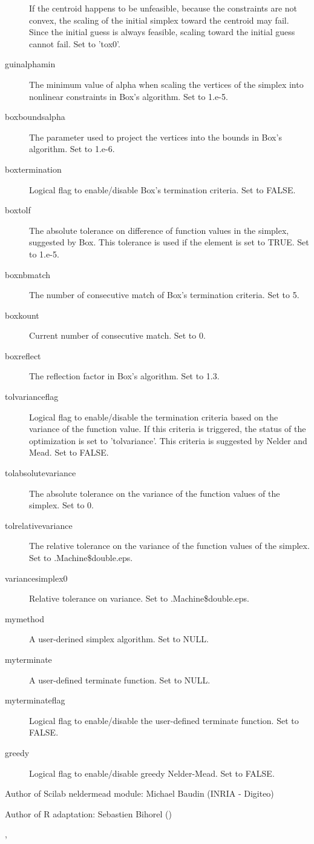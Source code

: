 \begin{Value}
\begin{description}
If the centroid happens to be unfeasible, because the constraints are not
convex, the scaling of the initial simplex toward the centroid may fail.
Since the initial guess is always feasible, scaling toward the initial
guess cannot fail. Set to 'tox0'.
\item[guinalphamin] The minimum value of alpha when scaling the vertices of
the simplex into nonlinear constraints in Box's algorithm. Set to 1.e-5.
\item[boxboundsalpha] The parameter used to project the vertices into the
bounds in Box's algorithm. Set to 1.e-6.
\item[boxtermination] Logical flag to enable/disable Box's termination
criteria. Set to FALSE.
\item[boxtolf] The absolute tolerance on difference of function values in
the simplex, suggested by Box. This tolerance is used if the
 element is set to TRUE. Set to 1.e-5.
\item[boxnbmatch] The number of consecutive match of Box's termination
criteria. Set to 5.
\item[boxkount] Current number of consecutive match. Set to 0.
\item[boxreflect] The reflection factor in Box's algorithm. Set to 1.3.
\item[tolvarianceflag] Logical flag to enable/disable the termination
criteria based on the variance of the function value. If this criteria is
triggered, the status of the optimization is set to 'tolvariance'. This
criteria is suggested by Nelder and Mead. Set to FALSE.
\item[tolabsolutevariance] The absolute tolerance on the variance of the
function values of the simplex. Set to 0.
\item[tolrelativevariance] The relative tolerance on the variance of the
function values of the simplex. Set to .Machine\$double.eps.
\item[variancesimplex0] Relative tolerance on variance. Set to
.Machine\$double.eps.
\item[mymethod] A user-derined simplex algorithm. Set to NULL.
\item[myterminate] A user-defined terminate function. Set to NULL.
\item[myterminateflag] Logical flag to enable/disable the user-defined
terminate function. Set to FALSE.
\item[greedy] Logical flag to enable/disable greedy Nelder-Mead. Set to
FALSE.

\end{description}

\end{Value}
%
\begin{Author}\relax
Author of Scilab neldermead module: Michael Baudin (INRIA - Digiteo)

Author of R adaptation: Sebastien Bihorel ()
\end{Author}
%
\begin{SeeAlso}\relax
{},
\end{SeeAlso}
